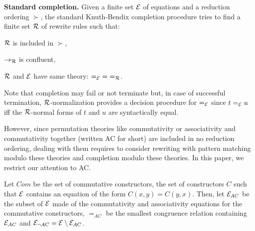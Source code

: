 
\noindent
{\bf Standard completion.} Given a finite set $\mathcal{E}$ of equations and a
reduction ordering $\succ$, the standard Knuth-Bendix completion
procedure \cite{bendix70book} tries to find a finite set $\mathcal{R}$ of
rewrite rules such that:

\begin{lst}{\bu}
\item $\mathcal{R}$ is included in $\succ$,
\item $\rightarrow_\mathcal{R}$ is confluent,
\item $\mathcal{R}$ and $\mathcal{E}$ have same theory: ${=_\mathcal{E}}={=_\mathcal{R}}$.
\end{lst}

Note that completion may fail or not terminate but, in case of
successful termination, $\mathcal{R}$-normalization provides a decision
procedure for $=_\mathcal{E}$ since $t=_\mathcal{E} u$ iff the $\mathcal{R}$-normal forms of
$t$ and $u$ are syntactically equal.\vsp[2mm]


However, since permutation theories like commutativity or
associativity and commutativity together (written AC for short) are
included in no reduction ordering, dealing with them requires to
consider rewriting with pattern matching modulo these theories and
completion modulo these theories. In this paper, we restrict our
attention to AC.

\begin{dfn}
Let $Com$ be the set of commutative constructors, \ie the set of
constructors $C$ such that $\mathcal{E}$ contains an equation of the form
$C(x,y)=C(y,x)$. Then, let $\mathcal{E}_{AC}$ be the subset of $\mathcal{E}$ made of
the commutativity and associativity equations for the commutative
constructors, $=_{AC}$ be the smallest congruence relation containing
$\mathcal{E}_{AC}$ and $\mathcal{E}_{\neg AC}=\mathcal{E}\setminus\mathcal{E}_{AC}$.
\end{dfn}

